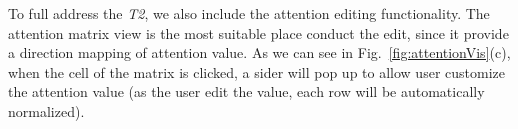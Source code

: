 To full address the \emph{T2}, we also include the attention editing functionality. The attention matrix view is the most suitable place conduct the edit, since it provide a direction mapping of attention value.
As we can see in Fig.~\ref{fig:attentionVis}(c), when the cell of the matrix is clicked, a sider will pop up to allow user customize the attention value (as the user edit the value, each row will be automatically normalized).




